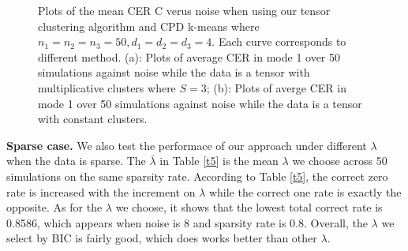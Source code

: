 \documentclass{article}
\begin{document}
\begin{figure}
	\centering
	\caption{Plots of the mean CER C verus noise when using our tensor clustering algorithm and CPD k-means where $n_1=n_2=n_3=50, d_1=d_2=d_3=4$. Each curve corresponds to different method. (a): Plots of average CER in mode 1 over 50 simulations against noise while the  data is a tensor with multiplicative clusters where $S=3$; (b): Plots of averge CER in mode 1 over 50 simulations against noise while the data is a tensor with constant clusters.}
	\label{fig4}
\end{figure}



\textbf{Sparse case.} We also test the performace of our approach under different $\lambda$ when the data is sparse. The $\bar{\lambda}$ in Table \ref{t5} is the mean $\lambda$ we choose across 50 simulations on the same sparsity rate. According to Table \ref{t5}, the correct zero rate is increased with the increment on $\lambda$ while the correct one rate is exactly the opposite. As for the $\lambda$ we choose, it shows that the lowest total correct rate is 0.8586, which appears when noise is 8 and sparsity rate is 0.8. Overall, the $\lambda$ we select by BIC is fairly good, which does works better than other $\lambda$.
\end{document}
